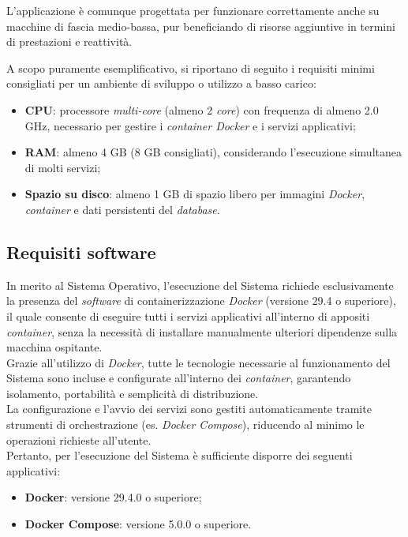 \documentclass[10pt, letterpaper]{article}
\begin{document}
L'applicazione è comunque progettata per funzionare correttamente anche su macchine di fascia medio-bassa, 
pur beneficiando di risorse aggiuntive in termini di prestazioni e reattività.

A scopo puramente esemplificativo, si riportano di seguito i requisiti minimi consigliati per un ambiente di sviluppo o utilizzo a basso carico:

\begin{itemize}
    \item \textbf{CPU}: processore \textit{multi-core} (almeno 2 \textit{core}) con frequenza di almeno 2.0 GHz, necessario per gestire i \textit{container Docker} e i servizi applicativi;
    \item \textbf{RAM}: almeno 4 GB (8 GB consigliati), considerando l'esecuzione simultanea di molti servizi;
    \item \textbf{Spazio su disco}: almeno 1 GB di spazio libero per immagini \textit{Docker}, \textit{container} e dati persistenti del \textit{database}.
\end{itemize}

\subsection{Requisiti software}
In merito al Sistema Operativo, l'esecuzione del Sistema richiede esclusivamente la presenza del \textit{software} di containerizzazione \textit{Docker} (versione 29.4 o superiore), 
il quale consente di eseguire tutti i servizi applicativi all'interno di appositi \textit{container}, senza la necessità di installare manualmente ulteriori dipendenze sulla macchina ospitante.
\\Grazie all'utilizzo di \textit{Docker}, tutte le tecnologie necessarie al funzionamento del Sistema 
sono incluse e configurate all'interno dei \textit{container}, garantendo isolamento, portabilità e semplicità di distribuzione.
\\La configurazione e l'avvio dei servizi sono gestiti automaticamente tramite strumenti di orchestrazione (es. \textit{Docker Compose}), 
riducendo al minimo le operazioni richieste all'utente.
\\Pertanto, per l'esecuzione del Sistema è sufficiente disporre dei seguenti applicativi:
\begin{itemize}
    \item \textbf{Docker}: versione 29.4.0 o superiore;
    \item \textbf{Docker Compose}: versione 5.0.0 o superiore.
\end{itemize}
\end{document}
